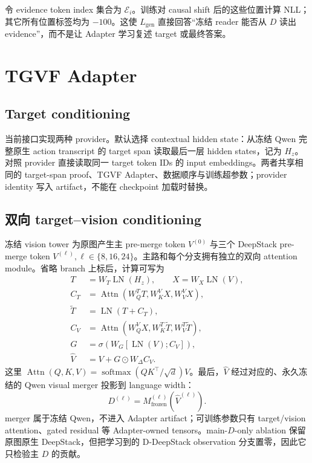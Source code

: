 \documentclass[UTF8,twocolumn,10pt,a4paper]{ctexart}
\newcommand{\softmax}{\operatorname{softmax}}
\newcommand{\LN}{\operatorname{LN}}
\begin{document}
令 evidence token index 集合为 $\mathcal E_i$。训练对 causal shift 后的这些位置计算 NLL；其它所有位置标签均为 $-100$。这使 $L_{\mathrm{gen}}$ 直接回答“冻结 reader 能否从 $D$ 读出 evidence”，而不是让 Adapter 学习复述 target 或最终答案。

\section{TGVF Adapter}
\subsection{Target conditioning}
当前接口实现两种 provider。默认选择 contextual hidden state：从冻结 Qwen 完整原生 action transcript 的 target span 读取最后一层 hidden states，记为 $H_z$。对照 provider 直接读取同一 target token IDs 的 input embeddings。两者共享相同的 target-span proof、TGVF Adapter、数据顺序与训练超参数；provider identity 写入 artifact，不能在 checkpoint 加载时替换。

\subsection{双向 target--vision conditioning}
冻结 vision tower 为原图产生主 pre-merge token $V^{(0)}$ 与三个 DeepStack pre-merge token $V^{(\ell)},\ell\in\{8,16,24\}$。主路和每个分支拥有独立的双向 attention module。省略 branch 上标后，计算可写为
\begin{align}
 T &= W_T\LN(H_z),\qquad X=W_X\LN(V),\\
 C_T &= \operatorname{Attn}(W_Q^T T,W_K^V X,W_V^V X),\\
 \widetilde T &= \LN(T+C_T),\\
 C_V &= \operatorname{Attn}(W_Q^V X,W_K^T\widetilde T,W_V^T\widetilde T),\\
 G &= \sigma\!\left(W_G[\LN(V);C_V]\right),\\
 \widehat V &= V+G\odot W_\Delta C_V.
 \label{eq:adapter}
\end{align}
这里 $\operatorname{Attn}(Q,K,V)=\softmax(QK^\top/\sqrt d)V$。最后，$\widehat V$ 经过对应的、永久冻结的 Qwen visual merger 投影到 language width：
\begin{equation}
  D^{(\ell)}=M^{(\ell)}_{\mathrm{frozen}}(\widehat V^{(\ell)}).
\end{equation}
merger 属于冻结 Qwen，不进入 Adapter artifact；可训练参数只有 target/vision attention、gated residual 等 Adapter-owned tensors。main-$D$-only ablation 保留原图原生 DeepStack，但把学习到的 D-DeepStack observation 分支置零，因此它只检验主 $D$ 的贡献。
\end{document}

